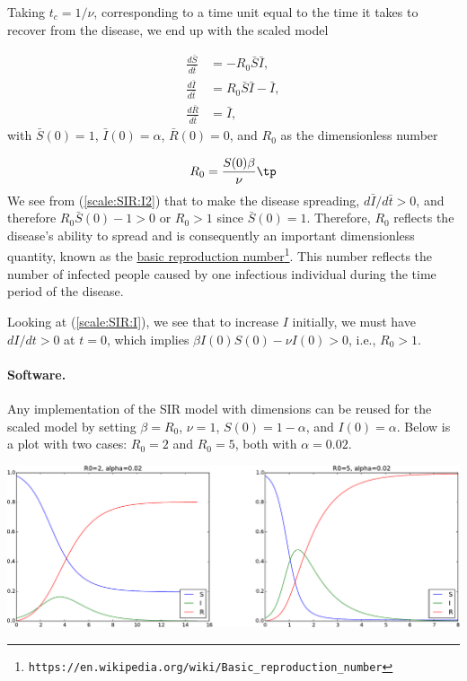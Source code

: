 \documentclass[graybox,envcountchap,sectrefs,final]{svmonodo}
\begin{document}
Taking $t_c=1/\nu$, corresponding to a time unit equal to the time it takes
to recover from the disease, we end up with the scaled model

\begin{align}
\frac{d\bar S}{d\bar t} &= - R_0\bar S\bar I,
\label{scale:SIR:S2}\\ 
\frac{d\bar I}{d\bar t} &= R_0 \bar S\bar I - \bar I,
\label{scale:SIR:I2}\\ 
\frac{d\bar R}{d\bar t} &= \bar I,
\label{scale:SIR:R2}
\end{align}
with $\bar S(0)=1$, $\bar I(0)=\alpha$, $\bar R(0)=0$, and $R_0$ as
the dimensionless number

\begin{equation}
R_0 = \frac{S(0)\beta}{\nu}\tp
\end{equation}
We see from (\ref{scale:SIR:I2}) that to make the disease spreading,
$d\bar I/d\bar t >0$, and therefore $R_0 \bar S(0) - 1 > 0$ or $R_0 > 1$
since $\bar S(0)=1$.
Therefore, $R_0$ reflects the disease's ability to spread and is
consequently an important dimensionless quantity, known as the \href{{https://en.wikipedia.org/wiki/Basic_reproduction_number}}{basic
reproduction number}\footnote{\texttt{https://en.wikipedia.org/wiki/Basic\_reproduction\_number}}.
This number reflects the number of infected people caused by one infectious
individual during the time period of the disease.

Looking at (\ref{scale:SIR:I}), we see that to increase $I$ initially,
we must have $dI/dt >0$ at $t=0$, which implies
$\beta I(0)S(0) - \nu I(0) >0$, i.e., $R_0 > 1$.

\paragraph{Software.}
Any implementation of the SIR model with dimensions can be reused for
the scaled model by setting $\beta = R_0$, $\nu = 1$, $S(0)=1-\alpha$,
and $I(0)=\alpha$. Below is a plot with two cases: $R_0=2$ and $R_0=5$,
both with $\alpha=0.02$.



\vspace{3mm}




\vspace{3mm}





\centerline{\includegraphics[width=1.0\linewidth]{fig-scaling/SIR1.pdf}}
\end{document}
